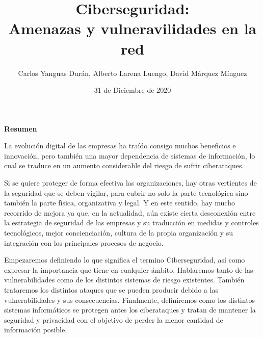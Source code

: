  
  
  

\graphicspath{{../Book/figures/}{../Book/diagrams/}{../Book/photos/}} 

 
\title{{\Huge Ciberseguridad: \\ Amenazas y vulneravilidades en la red}}
\date{{\large 31 de Diciembre de 2020}}
\author{{\Large  Carlos Yanguas Durán, Alberto Larena Luengo, David Márquez Mínguez}}



\maketitle
\thispagestyle{empty}\null\newpage




\setcounter{page}{1}
\begin{center}
 {\bfseries \Large Resumen}
\end{center}

La evolución digital de las empresas ha traído consigo muchos beneficios e innovación, pero también una mayor dependencia de sistemas de información, lo cual se traduce en un aumento considerable del riesgo de sufrir ciberataques.

Si se quiere proteger de forma efectiva las organizaciones, hay otras vertientes de la seguridad que se deben vigilar, para cubrir no solo la parte tecnológica sino también la parte física, organizativa y legal. Y en este sentido, hay mucho recorrido de mejora ya que, en la actualidad, aún existe cierta desconexión entre la estrategia de seguridad de las empresas y su traducción en medidas y controles tecnológicos, mejor concienciación, cultura de la propia organización y su integración con los principales procesos de negocio.

Empezaremos definiendo lo que significa el termino Ciberseguridad, así como expresar la importancia que tiene en cualquier ámbito. Hablaremos tanto de las vulnerabilidades como de los distintos sistemas de riesgo existentes. También trataremos los distintos ataques que se pueden producir debido a las vulnerabilidades y sus consecuencias. Finalmente, definiremos como los distintos sistemas informáticos se protegen antes los ciberataques y tratan de mantener la seguridad y privacidad con el objetivo de perder la menor cantidad de información posible.


